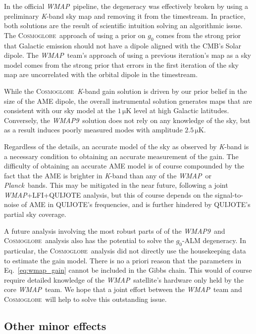 \documentclass[twocolumn]{../../common/aa}
\def\WMAP{\emph{WMAP}}
\def\WMAPnine{\emph{WMAP9}}
\def\Planck{\emph{Planck}}
\newcommand{\cosmoglobe}{\textsc{Cosmoglobe}}
\newcommand{\K}[0]{\textit K}
\begin{document}
In the official \WMAP\ pipeline, the degeneracy was effectively broken by using a preliminary \K-band sky map and removing it from the timestream.  In practice, both solutions are the result of scientific intuition solving an algorithmic issue. The \cosmoglobe\ approach of using a prior on $g_0$ comes from the strong prior that Galactic emission should not have a dipole aligned with the CMB's Solar dipole. The \WMAP\ team's approach of using a previous iteration's map as a sky model comes from the strong prior that errors in the first iteration of the sky map are uncorrelated with the orbital dipole in the timestream.

While the \cosmoglobe\ \K-band gain solution is driven by our prior belief in the size of the AME dipole, the overall instrumental solution generates maps that are consistent with our sky model at the $1\,\mathrm{\mu K}$ level at high Galactic latitudes. Conversely, the \WMAPnine\ solution does not rely on any knowledge of the sky, but as a result induces poorly measured modes with amplitude $2.5\,\mathrm{\mu K}$. 

Regardless of the details, an accurate model of the sky as observed by \K-band is a necessary condition to obtaining an accurate measurement of the gain. The difficulty of obtaining an accurate AME model is of course compounded by the fact that the AME is brighter in \K-band than any of the \WMAP\ or \Planck\ bands. This may be mitigated in the near future, following a joint \WMAP+LFI+QUIJOTE analysis, but this of course depends on the signal-to-noise of AME in QUIJOTE's frequencies, and is further hindered by QUIJOTE's partial sky coverage.

A future analysis involving the most robust parts of of the \WMAPnine\ and \cosmoglobe\ analysis also has the potential to solve the $g_0$-ALM degeneracy. In particular, the \cosmoglobe\ analysis did not directly use the housekeeping data to estimate the gain model. There is no a priori reason that the parameters in Eq.~\eqref{eq:wmap_gain} cannot be included in the Gibbs chain. This would of course require detailed knowledge of the \WMAP\ satellite's hardware only held by the core \WMAP\ team. We hope that a joint effort between the \WMAP\ team and \cosmoglobe\ will help to solve this outstanding issue.




\subsection{Other minor effects}
\label{sec:minor}
\end{document}
